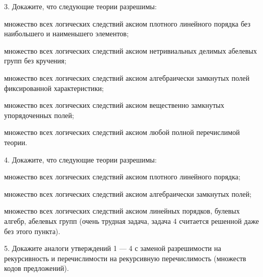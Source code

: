 \documentclass[a4paper,11pt]{article}
\begin{document}
3. Докажите, что следующие теории разрешимы: 

множество всех логических следствий аксиом плотного линейного порядка без наибольшего и наименьшего элементов; 

множество всех логических следствий аксиом нетривиальных делимых абелевых групп без кручения;

множество всех логических следствий аксиом алгебраически замкнутых полей фиксированной характеристики;

множество всех логических следствий аксиом вещественно замкнутых упорядоченных полей;

множество всех логических следствий аксиом любой полной перечислимой теории.
\medskip

4. Докажите, что следующие теории разрешимы: 

множество всех логических следствий аксиом плотного линейного порядка; 

множество всех логических следствий аксиом алгебраически замкнутых полей;

множество всех логических следствий аксиом линейных порядков, булевых алгебр, абелевых групп (очень трудная задача, задача 4 считается решенной даже без этого пункта).
\medskip

5. Докажите аналоги утверждений 1 --- 4 с заменой разрешимости на рекурсивность и перечислимости на рекурсивную перечислимость (множеств кодов предложений).
\end{document}
